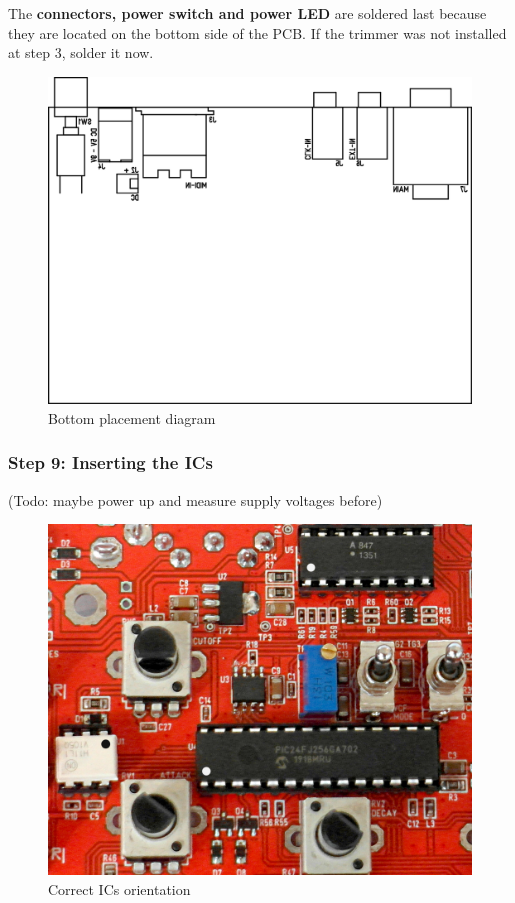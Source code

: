 \documentclass{scrartcl}
\begin{document}
The \textbf{connectors, power switch and power LED} are soldered last because they are located on the bottom side of the PCB.
If the trimmer was not installed at step 3, solder it now.

\begin{figure}[!ht]
    \begin{center}
        \includegraphics[scale=0.60]{assets/pcb-bot.png}
        \caption{Bottom placement diagram}
    \end{center}
\end{figure}

\subsubsection{Step 9: Inserting the ICs}

(Todo: maybe power up and measure supply voltages before)

\begin{figure}[!ht]
    \begin{center}
        \includegraphics[scale=0.20]{assets/ic-orientation.jpg}
        \caption{Correct ICs orientation}
    \end{center}
\end{figure}
\end{document}
